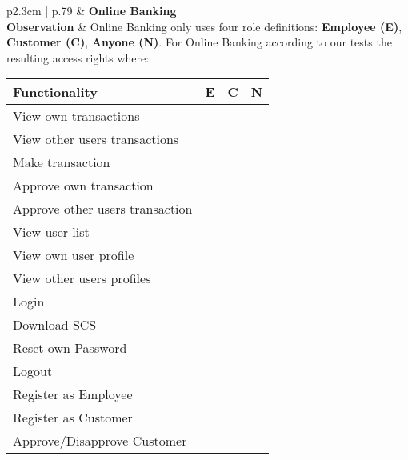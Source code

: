 \clearpage
\begin{longtable}[l]{ p{2.3cm} | p{.79\linewidth} }\hline
    & \textbf{Online Banking}
    \\ \hline
    \textbf{Observation} &
        Online Banking only uses four role definitions: \textbf{Employee (E)}, \textbf{Customer (C)}, \textbf{Anyone (N)}.
        For Online Banking according to our tests the resulting access rights where:
        \begin{center}
            \begin{tabular}{ | l | l | l | l |}
            \hline
            \textbf{Functionality}          & \textbf{E} & \textbf{C} & \textbf{N} \\ \hline
            View own transactions           & \xmark    & \cmark    & \xmark \\ \hline
            View other users transactions   & \cmark    & \xmark    & \xmark \\ \hline
            Make transaction                & \xmark    & \cmark    & \xmark \\ \hline
            Approve own transaction         & \xmark    & \xmark    & \xmark \\ \hline
            Approve other users transaction & \cmark    & \xmark    & \xmark \\ \hline
            View user list                  & \cmark    & \xmark    & \xmark \\ \hline
            View own user profile           & \cmark    & \cmark    & \xmark \\ \hline
            View other users profiles       & \cmark    & \xmark    & \xmark \\ \hline
            Login                           & \cmark    & \cmark    & \xmark \\ \hline
            Download SCS                    & \cmark    & \cmark    & \xmark \\ \hline
            Reset own Password              & \cmark    & \cmark    & \xmark \\ \hline
            Logout                          & \cmark    & \cmark    & \xmark \\ \hline
            Register as Employee            & \xmark    & \xmark    & \cmark \\ \hline
            Register as Customer            & \xmark    & \xmark    & \cmark \\ \hline
            Approve/Disapprove Customer     & \cmark    & \xmark    & \xmark \\ \hline

\end{tabular}
\end{center}
\end{longtable}
